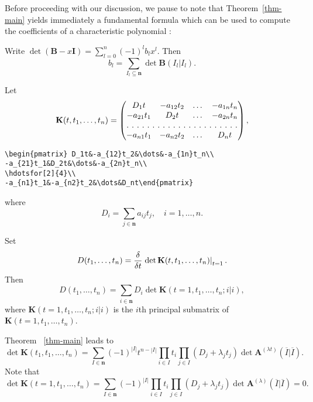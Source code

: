 \documentclass[mlq,fleqn]{w-art}
\newcommand{\thmref}[1]{Theorem~\ref{#1}}
\newcommand{\eval}[2][\right]{\relax
  \ifx#1\right\relax \left.\fi#2#1\rvert}
\newcommand{\envert}[1]{\left\lvert#1\right\rvert}
\begin{document}
Before proceeding with our discussion, we pause to note that
\thmref{thm-main} yields immediately a fundamental formula which can be
used to compute the coefficients of a characteristic polynomial
\cite{mami:matrixth}:
\begin{cor}\label{BI}
Write $\det(\mathbf{B}-x\mathbf{I})=\sum^n_{l =0}(-1)
^l b_l x^l $. Then
\begin{equation}\label{bl-sum}
b_l =\sum_{I_l \subseteq\mathbf{n}}\det\mathbf{B}(I_l |I_l ).
\end{equation}
\end{cor}
Let
\begin{equation}
\mathbf{K}(t,t_1,\dots,t_n)
=\begin{pmatrix} D_1t&-a_{12}t_2&\dots&-a_{1n}t_n\\
-a_{21}t_1&D_2t&\dots&-a_{2n}t_n\\
\hdotsfor[2]{4}\\
-a_{n1}t_1&-a_{n2}t_2&\dots&D_nt\end{pmatrix},
\end{equation}
\begin{verbatim}
\begin{pmatrix} D_1t&-a_{12}t_2&\dots&-a_{1n}t_n\\
-a_{21}t_1&D_2t&\dots&-a_{2n}t_n\\
\hdotsfor[2]{4}\\
-a_{n1}t_1&-a_{n2}t_2&\dots&D_nt\end{pmatrix}
\end{verbatim}
where
\begin{equation}
D_i=\sum_{j\in\mathbf{n}}a_{ij}t_j,\quad i=1,\dots,n.
\end{equation}

Set
\begin{equation*}
D(t_1,\dots,t_n)=\frac{\delta}{\delta t}\eval{\det\mathbf{K}(t,t_1,\dots,t_n)
}_{t=1}.
\end{equation*}
Then
\begin{equation}\label{sum-Di}
D(t_1,\dots,t_n)
=\sum_{i\in\mathbf{n}}D_i\det\mathbf{K}(t=1,t_1,\dots,t_n; i|i),
\end{equation}
where $\mathbf{K}(t=1,t_1,\dots,t_n; i|i)$ is the $i$th principal
submatrix of $\mathbf{K}(t=1,t_1,\dots,t_n)$.

Theorem ~\ref{thm-main} leads to
\begin{equation}\label{detK1}
\det\mathbf{K}(t_1,t_1,\dots,t_n)
=\sum_{I\in\mathbf{n}}(-1)^{\envert{I}}t^{n-\envert{I}}
\prod_{i\in I}t_i\prod_{j\in I}(D_j+\lambda_jt_j)\det\mathbf{A}
^{(\lambda t)}(\overline{I}|\overline I).
\end{equation}
Note that
\begin{equation}\label{detK2}
\det\mathbf{K}(t=1,t_1,\dots,t_n)=\sum_{I\in\mathbf{n}}(-1)^{\envert{I}}
\prod_{i\in I}t_i\prod_{j\in I}(D_j+\lambda_jt_j)\det\mathbf{A}
^{(\lambda)}(\overline{I}|\overline{I})=0.
\end{equation}
\end{document}
